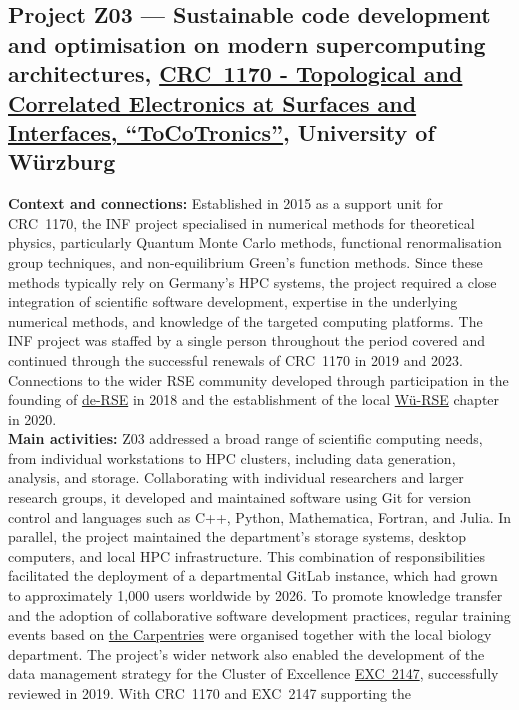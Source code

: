 \documentclass{eceasst}
\begin{document}
\subsection{Project Z03 --- Sustainable code development and optimisation on modern supercomputing architectures, \href{https://gepris.dfg.de/gepris/projekt/258499086?language=en}{CRC~1170 - Topological and Correlated Electronics at Surfaces and Interfaces, ``ToCoTronics''}, University of Würzburg}
\label{subsec:crc1170}
\noindent\textbf{Context and connections:}
Established in 2015 as a support unit for CRC~1170, the INF project
specialised in numerical methods for theoretical physics, particularly
Quantum Monte Carlo methods, functional renormalisation group techniques,
and non-equilibrium Green's function methods.
Since these methods typically rely on Germany's HPC
systems, the project required a close integration of scientific
software development, expertise in the underlying numerical methods, and
knowledge of the targeted computing platforms.
The INF project was staffed by a single person throughout the period covered and
continued through the successful renewals of CRC~1170 in 2019 and 2023.
Connections to the wider RSE community
developed through participation in the founding of
\href{https://de-rse.org/de/index.html}{de-RSE} in 2018 and the
establishment of the local
\href{https://de-rse.org/chapter/wue/}{Wü-RSE} chapter in 2020.
\\
\noindent\textbf{Main activities:}
Z03 addressed a broad range of scientific
computing needs, from individual workstations to HPC clusters, including data generation, analysis, and storage.
Collaborating with individual researchers and larger research groups,
it developed and maintained software using Git for version control and languages such as
C++, Python, Mathematica, Fortran, and Julia.
In parallel, the project maintained the department's storage systems,
desktop computers, and local HPC infrastructure.
This combination of responsibilities facilitated the deployment of a
departmental GitLab instance, which had grown to approximately 1,000
users worldwide by 2026.
To promote knowledge transfer and the adoption of collaborative software development practices, regular training events based on
\href{https://carpentries.org/}{the Carpentries} were organised together with the local biology department.
The project's wider network also enabled the development of the data management strategy for the Cluster of Excellence
\href{https://www.ctdqmat.de/}{EXC~2147}, successfully reviewed in 2019.
With CRC~1170 and EXC~2147 supporting the
\end{document}
